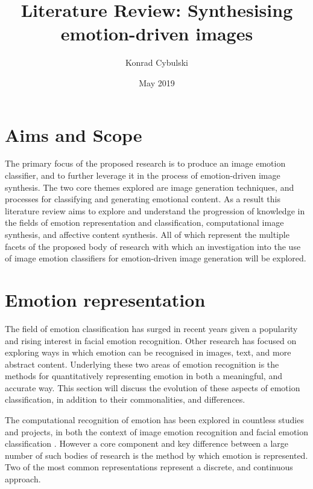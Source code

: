 \documentclass{article}
\title{Literature Review: Synthesising emotion-driven images}
\author{Konrad Cybulski}
\date{May 2019}
\begin{document}
	
\maketitle

\tableofcontents

\pagebreak

\section{Aims and Scope}

The primary focus of the proposed research is to produce an image emotion classifier, and to further leverage it in the process of emotion-driven image synthesis.
The two core themes explored are image generation techniques, and processes for classifying and generating emotional content.
As a result this literature review aims to explore and understand the progression of knowledge in the fields of emotion representation and classification, computational image synthesis, and affective content synthesis.
All of which represent the multiple facets of the proposed body of research with which an investigation into the use of image emotion classifiers for emotion-driven image generation will be explored.


\section{Emotion representation}

The field of emotion classification has surged in recent years given a popularity and rising interest in facial emotion recognition.
Other research has focused on exploring ways in which emotion can be recognised in images, text, and more abstract content.
Underlying these two areas of emotion recognition is the methods for quantitatively representing emotion in both a meaningful, and accurate way.
This section will discuss the evolution of these aspects of emotion classification, in addition to their commonalities, and differences.

The computational recognition of emotion has been explored in countless studies and projects, in both the context of image emotion recognition \citep{machajdik2010affective,zhao2014exploring,kim2018building} and facial emotion classification \citep{mollahosseini2016going}.
However a core component and key difference between a large number of such bodies of research is the method by which emotion is represented.
Two of the most common representations represent a discrete, and continuous approach.
\end{document}

